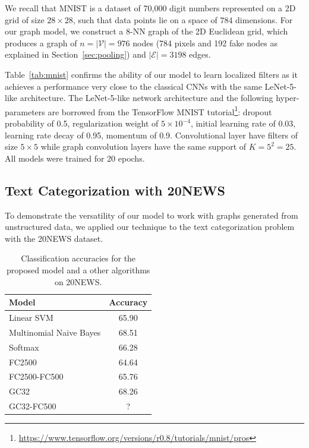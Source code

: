 \documentclass{article}
\newcommand{\V}{\mathcal{V}}
\newcommand{\E}{\mathcal{E}}
\newcommand{\tabref}[1]{Table~\ref{tab:#1}}
\newcommand{\secref}[1]{Section~\ref{sec:#1}}
\newcommand{\todo}[1]{{\color{red} #1 }}
\begin{document}
We recall that MNIST is a dataset of 70,000 digit numbers represented on a 2D grid of size $28
\times 28$, such that data points lie on a space of $784$ dimensions. For
our graph model, we construct a $8$-NN graph of the 2D Euclidean
grid, which produces a graph of $n = |\V| = 976$ nodes (784 pixels and 192 fake
nodes as explained in \secref{pooling}) and $|\E| = 3198$ edges.

\tabref{mnist} confirms the ability of our model to learn localized filters
as it achieves a performance very close to the classical CNNs with the same LeNet-5-like
architecture. The LeNet-5-like network architecture and the following hyper-parameters are
borrowed from the TensorFlow MNIST tutorial\footnote{
\url{https://www.tensorflow.org/versions/r0.8/tutorials/mnist/pros}}: dropout
probability of 0.5, regularization weight of $5\times10^{-4}$, initial learning
rate of 0.03, learning rate decay of 0.95, momentum of 0.9. Convolutional layer
have filters of size $5 \times 5$ while graph convolution layers have the same
support of $K = 5^2 = 25$. All models were trained for 20 epochs.







\subsection{Text Categorization with 20NEWS}
To demonstrate the versatility of our model to work with graphs generated from unstructured data, we applied our technique to the text categorization problem with the 20NEWS dataset.


\begin{table}[h!] \centering
\vspace{0.5cm}
\begin{tabular}{lc} \toprule
Model & Accuracy \\
\midrule
Linear SVM & 65.90 \\
Multinomial Naive Bayes & 68.51 \\
Softmax & 66.28 \\
\addlinespace
FC2500 & 64.64 \\
FC2500-FC500 & 65.76 \\
\addlinespace
GC32 & 68.26 \\
GC32-FC500 & \todo{?} \\
\bottomrule \end{tabular}
\caption{Classification accuracies for the proposed model and a other algorithms
on 20NEWS.} 
\label{tab:20news}
\end{table}
\end{document}
